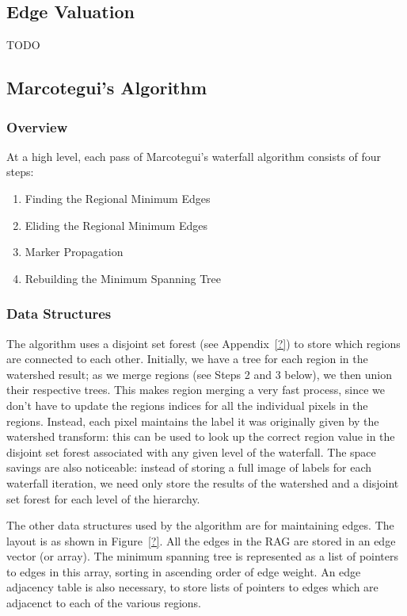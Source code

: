 \subsection{Edge Valuation}

TODO

\subsection{Marcotegui's Algorithm}

\subsubsection{Overview}

At a high level, each pass of Marcotegui's waterfall algorithm consists of four steps:
%
\begin{enumerate}

\item Finding the Regional Minimum Edges
\item Eliding the Regional Minimum Edges
\item Marker Propagation
\item Rebuilding the Minimum Spanning Tree

\end{enumerate}

\subsubsection{Data Structures}

The algorithm uses a disjoint set forest (see Appendix~\ref{?}) to store which regions are connected to each other. Initially, we have a tree for each region in the watershed result; as we merge regions (see Steps 2 and 3 below), we then union their respective trees. This makes region merging a very fast process, since we don't have to update the regions indices for all the individual pixels in the regions. Instead, each pixel maintains the label it was originally given by the watershed transform: this can be used to look up the correct region value in the disjoint set forest associated with any given level of the waterfall. The space savings are also noticeable: instead of storing a full image of labels for each waterfall iteration, we need only store the results of the watershed and a disjoint set forest for each level of the hierarchy.

The other data structures used by the algorithm are for maintaining edges. The layout is as shown in Figure~\ref{?}. All the edges in the RAG are stored in an edge vector (or array). The minimum spanning tree is represented as a list of pointers to edges in this array, sorting in ascending order of edge weight. An edge adjacency table is also necessary, to store lists of pointers to edges which are adjacenct to each of the various regions.

